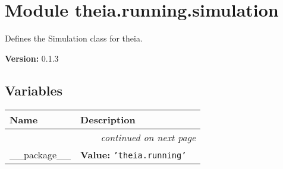 %
%
%


\section{Module theia.running.simulation}

    \label{theia:running:simulation}
Defines the Simulation class for theia.

\textbf{Version:} 0.1.3





  \subsection{Variables}

    \vspace{-1cm}
\hspace{\varindent}\begin{longtable}{|p{\varnamewidth}|p{\vardescrwidth}|l}
\cline{1-2}
\cline{1-2} \centering \textbf{Name} & \centering \textbf{Description}& \\
\cline{1-2}
\endhead\cline{1-2}\multicolumn{3}{r}{\small\textit{continued on next page}}\\\endfoot\cline{1-2}
\endlastfoot\raggedright \_\-\_\-p\-a\-c\-k\-a\-g\-e\-\_\-\_\- & \raggedright \textbf{Value:} 
{\tt \texttt{'}\texttt{theia.running}\texttt{'}}&\\
\cline{1-2}
\end{longtable}




